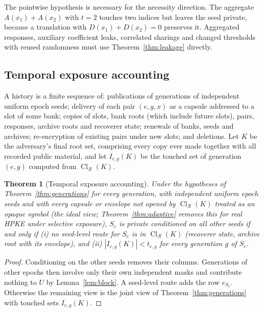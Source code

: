 \documentclass[pdflatex,sn-mathphys-num]{sn-jnl}
\theoremstyle{plain}
\newtheorem{theorem}{Theorem}
\theoremstyle{definition}
\newcommand{\Cl}{\operatorname{Cl}}
\begin{document}
The pointwise hypothesis is necessary for the necessity direction. The aggregate $A(x_1)+A(x_2)$ with $t=2$ touches two indices but leaves the seed private, because a translation with $D(x_1)+D(x_2)=0$ preserves it. Aggregated responses, auxiliary coefficient leaks, correlated sharings and changed thresholds with reused randomness must use Theorem~\ref{thm:leakage} directly.

\subsection{Temporal exposure accounting}
A history is a finite sequence of: publications of generations of independent uniform epoch seeds; delivery of each pair $(e,g,x)$ as a capsule addressed to a slot of some bank; copies of slots, bank roots (which include future slots), pairs, responses, archive roots and recoverer state; renewals of banks, seeds and archives; re-encryption of existing pairs under new slots; and deletions. Let $K$ be the adversary's final root set, comprising every copy ever made together with all recorded public material, and let $I_{e,g}(K)$ be the touched set of generation $(e,g)$ computed from $\Cl_{\mathcal R}(K)$.

\begin{theorem}[Temporal exposure accounting]\label{thm:temporal}
Under the hypotheses of Theorem~\ref{thm:generations} for every generation, with independent uniform epoch seeds and with every capsule or envelope not opened by $\Cl_{\mathcal R}(K)$ treated as an opaque symbol (the ideal view; Theorem~\ref{thm:adaptive} removes this for real HPKE under selective exposure), $S_e$ is private conditioned on all other seeds if and only if (i) no seed-level route for $S_e$ is in $\Cl_{\mathcal R}(K)$ (recoverer state, archive root with its envelope), and (ii) $|I_{e,g}(K)|<t_{e,g}$ for every generation $g$ of $S_e$.
\end{theorem}
\begin{proof}
Conditioning on the other seeds removes their columns. Generations of other epochs then involve only their own independent masks and contribute nothing to $U$ by Lemma~\ref{lem:block}. A seed-level route adds the row $e_{S_e}$. Otherwise the remaining view is the joint view of Theorem~\ref{thm:generations} with touched sets $I_{e,g}(K)$.
\end{proof}
\end{document}
